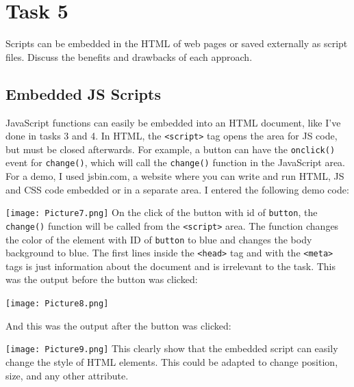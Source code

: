 \documentclass[a4paper]{article}
\begin{document}
\section{Task 5}
Scripts can be embedded in the HTML of web pages or saved externally as script files. Discuss the benefits and drawbacks of each approach.
\subsection{Embedded JS Scripts}
JavaScript functions can easily be embedded into an HTML document, like I've done in tasks 3 and 4. In HTML, the \verb|<script>| tag opens the area for JS code, but must be closed afterwards. For example, a button can have the \verb|onclick()| event for \verb|change()|, which will call the \verb|change()| function in the JavaScript area. For a demo, I used jsbin.com, a website where you can write and run HTML, JS and CSS code embedded or in a separate area. I entered the following demo code: \par
\noindent\texttt{[image: Picture7.png]}
On the click of the button with id of \verb|button|, the \verb|change()| function will be called from the \verb|<script>| area. The function changes the color of the element with ID of \verb|button| to blue and changes the body background to blue. The first lines inside the \verb|<head>| tag and with the \verb|<meta>| tags is just information about the document and is irrelevant to the task. This was the output before the button was clicked: \par
\noindent\texttt{[image: Picture8.png]}\par \newpage
And this was the output after the button was clicked: \par
\noindent\texttt{[image: Picture9.png]}
This clearly show that the embedded script can easily change the style of HTML elements. This could be adapted to change position, size, and any other attribute. \newpage
\end{document}
